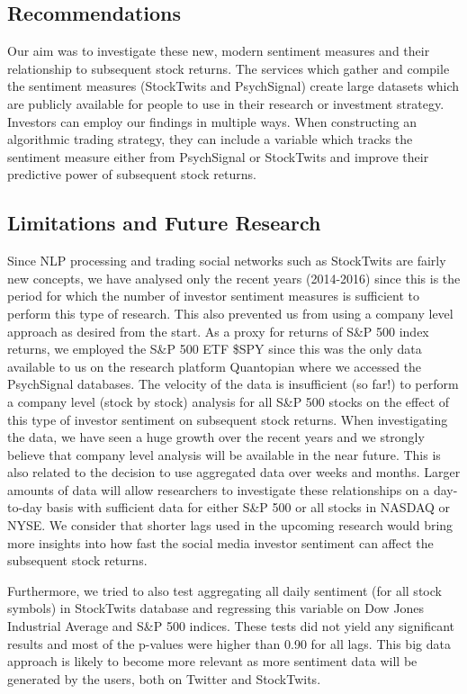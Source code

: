 \subsection{Recommendations}
Our aim was to investigate these new, modern sentiment measures and their relationship to subsequent stock returns. The services which gather and compile the sentiment measures (StockTwits and PsychSignal) create large datasets which are publicly available for people to use in their research or investment strategy. Investors can employ our findings in multiple ways. When constructing an algorithmic trading strategy, they can include a variable which tracks the sentiment measure either from PsychSignal or StockTwits and improve their predictive power of subsequent stock returns.

\subsection{Limitations and Future Research}
Since NLP processing and trading social networks such as StockTwits are fairly new concepts, we have analysed only the recent years (2014-2016) since this is the period for which the number of investor sentiment measures is sufficient to perform this type of research. This also prevented us from using a company level approach as desired from the start. As a proxy for returns of S\&P 500 index returns, we employed the S\&P 500 ETF \$SPY since this was the only data available to us on the research platform Quantopian where we accessed the PsychSignal databases. The velocity of the data is insufficient (so far!) to perform a company level (stock by stock) analysis for all S\&P 500 stocks on the effect of this type of investor sentiment on subsequent stock returns. When investigating the data, we have seen a huge growth over the recent years and we strongly believe that company level analysis will be available in the near future. This is also related to the decision to use aggregated data over weeks and months. Larger amounts of data will allow researchers to investigate these relationships on a day-to-day basis with sufficient data for either S\&P 500 or all stocks in NASDAQ or NYSE. We consider that shorter lags used in the upcoming research would bring more insights into how fast the social media investor sentiment can affect the subsequent stock returns.
\par
Furthermore, we tried to also test aggregating all daily sentiment (for all stock symbols) in StockTwits database and regressing this variable on Dow Jones Industrial Average and S\&P 500 indices. These tests did not yield any significant results and most of the p-values were higher than 0.90 for all lags. This big data approach is likely to become more relevant as more sentiment data will be generated by the users, both on Twitter and StockTwits.
